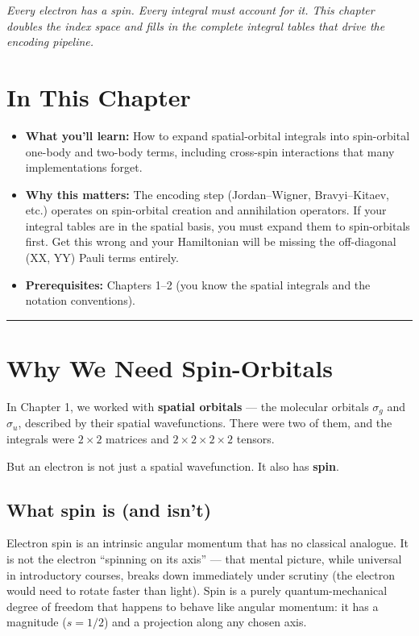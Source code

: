 \documentclass[
  11pt,
  oneside]{book}
\providecommand{\tightlist}{%
  \setlength{\itemsep}{0pt}\setlength{\parskip}{0pt}}
\begin{document}
\emph{Every electron has a spin. Every integral must account for it.
This chapter doubles the index space and fills in the complete integral
tables that drive the encoding pipeline.}

\section{In This Chapter}\label{in-this-chapter-2}

\begin{itemize}
\tightlist
\item
  \textbf{What you'll learn:} How to expand spatial-orbital integrals
  into spin-orbital one-body and two-body terms, including cross-spin
  interactions that many implementations forget.
\item
  \textbf{Why this matters:} The encoding step (Jordan--Wigner,
  Bravyi--Kitaev, etc.) operates on spin-orbital creation and
  annihilation operators. If your integral tables are in the spatial
  basis, you must expand them to spin-orbitals first. Get this wrong and
  your Hamiltonian will be missing the off-diagonal (XX, YY) Pauli terms
  entirely.
\item
  \textbf{Prerequisites:} Chapters 1--2 (you know the spatial integrals
  and the notation conventions).
\end{itemize}

\begin{center}\rule{0.5\linewidth}{0.5pt}\end{center}

\section{Why We Need Spin-Orbitals}\label{why-we-need-spin-orbitals}

In Chapter 1, we worked with \textbf{spatial orbitals} --- the molecular
orbitals \(\sigma_g\) and \(\sigma_u\), described by their spatial
wavefunctions. There were two of them, and the integrals were
\(2 \times 2\) matrices and \(2 \times 2 \times 2 \times 2\) tensors.

But an electron is not just a spatial wavefunction. It also has
\textbf{spin}.

\subsection{What spin is (and isn't)}\label{what-spin-is-and-isnt}

Electron spin is an intrinsic angular momentum that has no classical
analogue. It is not the electron ``spinning on its axis'' --- that
mental picture, while universal in introductory courses, breaks down
immediately under scrutiny (the electron would need to rotate faster
than light). Spin is a purely quantum-mechanical degree of freedom that
happens to behave like angular momentum: it has a magnitude
(\(s = 1/2\)) and a projection along any chosen axis.
\end{document}
